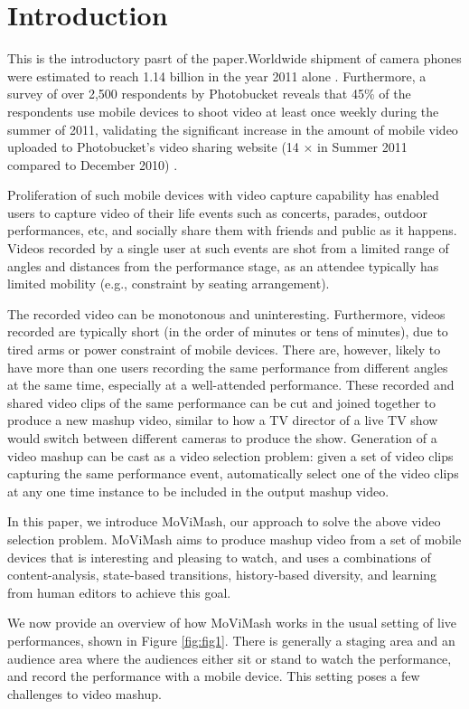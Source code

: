 \documentclass{sig-alternate}
\begin{document}
\section{Introduction}
This is the introductory pasrt of the paper.Worldwide shipment of camera phones were estimated to reach
1.14 billion in the year 2011 alone \cite{1}. Furthermore, a survey of over 2,500 respondents by Photobucket reveals that 45\% of the respondents use mobile devices to shoot video at least once weekly during the summer of 2011, validating the significant increase in the amount of mobile video uploaded to Photobucket's video sharing website (14 $\times$ in Summer 2011 compared to December 2010) \cite{2}.

Proliferation of such mobile devices with video capture capability has enabled users to capture video of their life events such as concerts, parades, outdoor performances, etc, and socially share
them with friends and public as it happens. Videos recorded by a single user at such events are shot from a limited range of angles and distances from the performance stage, as an attendee typically has limited mobility (e.g., constraint by seating arrangement).

The recorded video can be monotonous and uninteresting. Furthermore, videos recorded are typically short (in the order of minutes or tens of minutes), due to tired arms or power constraint of mobile devices. There are, however, likely to have more than one users
recording the same performance from different angles at the same
time, especially at a well-attended performance.
These recorded and shared video clips of the same performance
can be cut and joined together to produce a new mashup video, similar to how a TV director of a live TV show would switch between different cameras to produce the show. Generation of a video mashup can be cast as a video selection problem: given a set of video clips capturing the same performance event, automatically select one of the video clips at any one time instance to be included in the output mashup video.

In this paper, we introduce MoViMash, our approach to solve
the above video selection problem. MoViMash aims to produce
mashup video from a set of mobile devices that is interesting and
pleasing to watch, and uses a combinations of content-analysis,
state-based transitions, history-based diversity, and learning from
human editors to achieve this goal.

We now provide an overview of how MoViMash works in the
usual setting of live performances, shown in Figure \ref{fig:fig1}. There is
generally a staging area and an audience area where the audiences either sit or stand to watch the performance, and record the performance with a mobile device. This setting poses a few challenges to video mashup.
\end{document}
